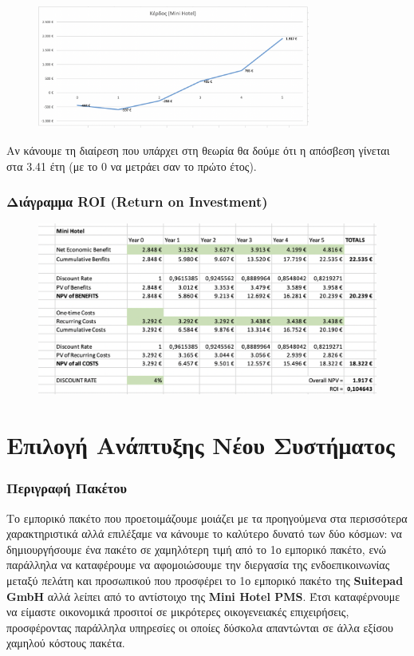 \begin{figure}[H]
	\includegraphics[width=0.8\textwidth]{Images/4.2.5}
\end{figure}

\noindent
Αν κάνουμε τη διαίρεση που υπάρχει στη θεωρία θα δούμε ότι η απόσβεση γίνεται στα 
3.41 έτη (με το 0 να μετράει σαν το πρώτο έτος).

\subsubsection{Διάγραμμα ROI (Return on Investment)}
\begin{figure}[H]
	\centering
	\includegraphics[width=1\textwidth]{Images/4.2.6}
\end{figure}

\section{Επιλογή Ανάπτυξης Νέου Συστήματος}
\subsubsection{Περιγραφή Πακέτου}
Το εμπορικό πακέτο που προετοιμάζουμε μοιάζει με τα προηγούμενα στα περισσότερα 
χαρακτηριστικά αλλά επιλέξαμε να κάνουμε το καλύτερο δυνατό των δύο κόσμων: να 
δημιουργήσουμε ένα πακέτο σε χαμηλότερη τιμή από το 1ο εμπορικό πακέτο, ενώ 
παράλληλα να καταφέρουμε να αφομοιώσουμε την διεργασία της ενδοεπικοινωνίας 
μεταξύ πελάτη και προσωπικού που προσφέρει το 1ο εμπορικό πακέτο της \textbf{
Suitepad GmbH} αλλά λείπει από το αντίστοιχο της \textbf{Mini Hotel PMS}. Έτσι 
καταφέρνουμε να είμαστε οικονομικά προσιτοί σε μικρότερες οικογενειακές επιχειρήσεις,
προσφέροντας παράλληλα υπηρεσίες οι οποίες δύσκολα απαντώνται σε άλλα εξίσου 
χαμηλού κόστους πακέτα. \\

